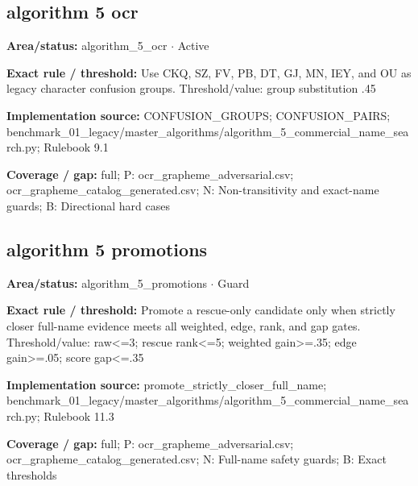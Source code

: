 \subsection*{algorithm 5 ocr}
\begin{tcolorbox}[enhanced,breakable,colback=white,colframe=Muted!45,boxrule=0.45pt,arc=1.5pt,left=6pt,right=6pt,top=5pt,bottom=5pt,title={\texttt{A5-SIMPLE-CONFUSIONS-09}},title after break={\texttt{A5-SIMPLE-CONFUSIONS-09}\ (continued)},fonttitle=\headingfont\bfseries\color{Navy},coltitle=Navy]
\textbf{Area/status:} algorithm\_\allowbreak{}5\_\allowbreak{}ocr $\boldsymbol{\cdot}$ Active\par
\smallskip
\textbf{Exact rule / threshold:} Use CKQ, SZ, FV, PB, DT, GJ, MN, IEY, and OU as legacy character confusion groups. Threshold/\allowbreak{}value: group substitution .45\par
\smallskip
\textbf{Implementation source:} CONFUSION\_\allowbreak{}GROUPS; CONFUSION\_\allowbreak{}PAIRS; benchmark\_\allowbreak{}01\_\allowbreak{}legacy/\allowbreak{}master\_\allowbreak{}algorithms/\allowbreak{}algorithm\_\allowbreak{}5\_\allowbreak{}commercial\_\allowbreak{}name\_\allowbreak{}search.py; Rulebook 9.1\par
\smallskip
\textbf{Coverage / gap:} full; P: ocr\_\allowbreak{}grapheme\_\allowbreak{}adversarial.csv; ocr\_\allowbreak{}grapheme\_\allowbreak{}catalog\_\allowbreak{}generated.csv; N: Non-transitivity and exact-name guards; B: Directional hard cases
\end{tcolorbox}
\medskip
\subsection*{algorithm 5 promotions}
\begin{tcolorbox}[enhanced,breakable,colback=white,colframe=Muted!45,boxrule=0.45pt,arc=1.5pt,left=6pt,right=6pt,top=5pt,bottom=5pt,title={\texttt{A5-STRICT-FULL-18}},title after break={\texttt{A5-STRICT-FULL-18}\ (continued)},fonttitle=\headingfont\bfseries\color{Navy},coltitle=Navy]
\textbf{Area/status:} algorithm\_\allowbreak{}5\_\allowbreak{}promotions $\boldsymbol{\cdot}$ Guard\par
\smallskip
\textbf{Exact rule / threshold:} Promote a rescue-only candidate only when strictly closer full-name evidence meets all weighted, edge, rank, and gap gates. Threshold/\allowbreak{}value: raw<=3; rescue rank<=5; weighted gain>=.35; edge gain>=.05; score gap<=.35\par
\smallskip
\textbf{Implementation source:} promote\_\allowbreak{}strictly\_\allowbreak{}closer\_\allowbreak{}full\_\allowbreak{}name; benchmark\_\allowbreak{}01\_\allowbreak{}legacy/\allowbreak{}master\_\allowbreak{}algorithms/\allowbreak{}algorithm\_\allowbreak{}5\_\allowbreak{}commercial\_\allowbreak{}name\_\allowbreak{}search.py; Rulebook 11.3\par
\smallskip
\textbf{Coverage / gap:} full; P: ocr\_\allowbreak{}grapheme\_\allowbreak{}adversarial.csv; ocr\_\allowbreak{}grapheme\_\allowbreak{}catalog\_\allowbreak{}generated.csv; N: Full-name safety guards; B: Exact thresholds
\end{tcolorbox}
\medskip
